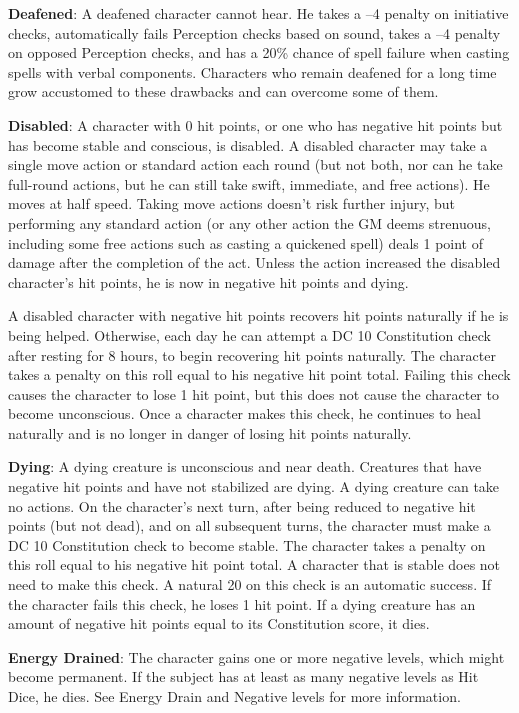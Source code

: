 \textbf{Deafened}: A deafened character cannot hear. He takes a --4 penalty on initiative checks, automatically fails Perception checks based on sound, takes a --4 penalty on opposed Perception checks, and has a 20\% chance of spell failure when casting spells with verbal components. Characters who remain deafened for a long time grow accustomed to these drawbacks and can overcome some of them.
				
\textbf{Disabled}: A character with 0 hit points, or one who has negative hit points but has become stable and conscious, is disabled. A disabled character may take a single move action or standard action each round (but not both, nor can he take full-round actions, but he can still take swift, immediate, and free actions). He moves at half speed. Taking move actions doesn't risk further injury, but performing any standard action (or any other action the GM deems strenuous, including some free actions such as casting a quickened spell) deals 1 point of damage after the completion of the act. Unless the action increased the disabled character's hit points, he is now in negative hit points and dying.
				
A disabled character with negative hit points recovers hit points naturally if he is being helped. Otherwise, each day he can attempt a DC 10 Constitution check after resting for 8 hours, to begin recovering hit points naturally. The character takes a penalty on this roll equal to his negative hit point total. Failing this check causes the character to lose 1 hit point, but this does not cause the character to become unconscious. Once a character makes this check, he continues to heal naturally and is no longer in danger of losing hit points naturally.
				
\textbf{Dying}: A dying creature is unconscious and near death. Creatures that have negative hit points and have not stabilized are dying. A dying creature can take no actions. On the character's next turn, after being reduced to negative hit points (but not dead), and on all subsequent turns, the character must make a DC 10 Constitution check to become stable. The character takes a penalty on this roll equal to his negative hit point total. A character that is stable does not need to make this check. A natural 20 on this check is an automatic success. If the character fails this check, he loses 1 hit point. If a dying creature has an amount of negative hit points equal to its Constitution score, it dies.
				
\textbf{Energy Drained}: The character gains one or more negative levels, which might become permanent. If the subject has at least as many negative levels as Hit Dice, he dies. See Energy Drain and Negative levels for more information. 
				
